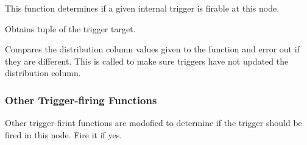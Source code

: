

  This function determines if a given internal trigger is firable at this node.




  Obtains tuple of the trigger target.




  Compares the distribution column values given to the function and error out if they
  are different.
  This is called to make sure triggers have not updated the distribution column.



\subsubsection{Other Trigger-firing Functions}

Other trigger-firint functions are modofied to determine if the trigger should be fired
in this node.
Fire it if yes.

